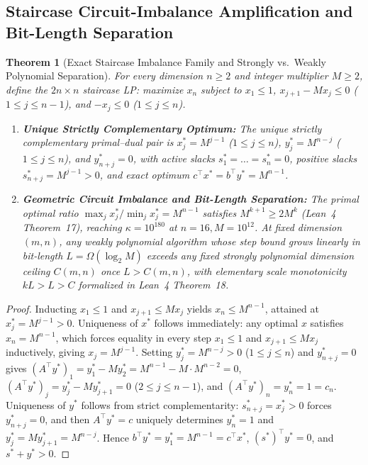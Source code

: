 \documentclass[11pt,a4paper]{article}
\newtheorem{theorem}{Theorem}[section]
\theoremstyle{definition}
\theoremstyle{remark}
\begin{document}
\subsection{Staircase Circuit-Imbalance Amplification and Bit-Length Separation}

\begin{theorem}[Exact Staircase Imbalance Family and Strongly vs.\ Weakly Polynomial Separation]\label{thm:staircase}
For every dimension $n \ge 2$ and integer multiplier $M \ge 2$, define the $2n \times n$ staircase LP: maximize $x_n$ subject to $x_1 \le 1$, $x_{j+1} - M x_j \le 0$ ($1 \le j \le n-1$), and $-x_j \le 0$ ($1 \le j \le n$).
\begin{enumerate}[leftmargin=1.8em,itemsep=2pt]
  \item \textbf{Unique Strictly Complementary Optimum:} The unique strictly complementary primal--dual pair is $x^*_j = M^{j-1}$ ($1 \le j \le n$), $y^*_j = M^{n-j}$ ($1 \le j \le n$), and $y^*_{n+j} = 0$, with active slacks $s^*_1 = \dots = s^*_n = 0$, positive slacks $s^*_{n+j} = M^{j-1} > 0$, and exact optimum $c^\top x^* = b^\top y^* = M^{n-1}$.
  \item \textbf{Geometric Circuit Imbalance and Bit-Length Separation:} The primal optimal ratio $\max_j x^*_j / \min_j x^*_j = M^{n-1}$ satisfies $M^{k+1} \ge 2 M^k$ (Lean~4 Theorem~17), reaching $\kappa = 10^{180}$ at $n=16, M=10^{12}$. At fixed dimension $(m, n)$, any weakly polynomial algorithm whose step bound grows linearly in bit-length $L = \Omega(\log_2 M)$ exceeds any fixed strongly polynomial dimension ceiling $C(m,n)$ once $L > C(m,n)$, with elementary scale monotonicity $kL > L > C$ formalized in Lean~4 Theorem~18.
\end{enumerate}
\end{theorem}

\begin{proof}
Inducting $x_1 \le 1$ and $x_{j+1} \le M x_j$ yields $x_n \le M^{n-1}$, attained at $x^*_j = M^{j-1} > 0$. Uniqueness of $x^*$ follows immediately: any optimal $x$ satisfies $x_n = M^{n-1}$, which forces equality in every step $x_1 \le 1$ and $x_{j+1} \le M x_j$ inductively, giving $x_j = M^{j-1}$. Setting $y^*_j = M^{n-j} > 0$ ($1 \le j \le n$) and $y^*_{n+j} = 0$ gives $(A^\top y^*)_1 = y^*_1 - M y^*_2 = M^{n-1} - M \cdot M^{n-2} = 0$, $(A^\top y^*)_j = y^*_j - M y^*_{j+1} = 0$ ($2 \le j \le n-1$), and $(A^\top y^*)_n = y^*_n = 1 = c_n$. Uniqueness of $y^*$ follows from strict complementarity: $s^*_{n+j} = x^*_j > 0$ forces $y^*_{n+j} = 0$, and then $A^\top y^* = c$ uniquely determines $y^*_n = 1$ and $y^*_j = M y^*_{j+1} = M^{n-j}$. Hence $b^\top y^* = y^*_1 = M^{n-1} = c^\top x^*$, $(s^*)^\top y^* = 0$, and $s^* + y^* > 0$.
\end{proof}
\end{document}
